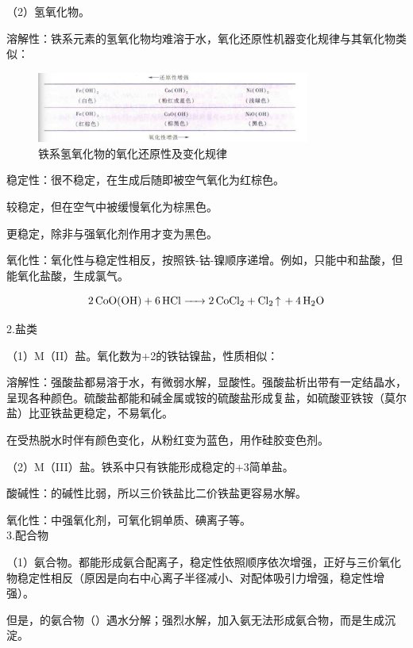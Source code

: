 \documentclass[a4paper,UTF8]{article}
\begin{document}
（2）氢氧化物。

溶解性：铁系元素的氢氧化物均难溶于水，氧化还原性机器变化规律与其氧化物类似：

\begin{figure}[htpb]
	\centering
	\includegraphics[width=0.8\textwidth]{figure//铁系氢氧化物.png}
	\caption{铁系氢氧化物的氧化还原性及变化规律}
	\label{fig:}
\end{figure}

稳定性：很不稳定，在生成后随即被空气氧化为红棕色。

较稳定，但在空气中被缓慢氧化为棕黑色。

更稳定，除非与强氧化剂作用才变为黑色。

氧化性：氧化性与稳定性相反，按照铁-钴-镍顺序递增。例如，只能中和盐酸，但能氧化盐酸，生成氯气。

$$ \ce{2CoO(OH) + 6HCl -> 2CoCl2 + Cl2 ^ + 4H2O} $$

2.盐类

（1）M（II）盐。氧化数为+2的铁钴镍盐，性质相似：

溶解性：强酸盐都易溶于水，有微弱水解，显酸性。强酸盐析出带有一定结晶水，呈现各种颜色。硫酸盐都能和碱金属或铵的硫酸盐形成复盐，如硫酸亚铁铵（莫尔盐）比亚铁盐更稳定，不易氧化。

在受热脱水时伴有颜色变化，从粉红变为蓝色，用作硅胶变色剂。

（2）M（III）盐。铁系中只有铁能形成稳定的+3简单盐。

酸碱性：的碱性比弱，所以三价铁盐比二价铁盐更容易水解。

氧化性：中强氧化剂，可氧化铜单质、碘离子等。\\

3.配合物

（1）氨合物。都能形成氨合配离子，稳定性依照顺序依次增强，正好与三价氧化物稳定性相反（原因是向右中心离子半径减小、对配体吸引力增强，稳定性增强）。

但是，的氨合物（）遇水分解；强烈水解，加入氨无法形成氨合物，而是生成沉淀。
\end{document}
